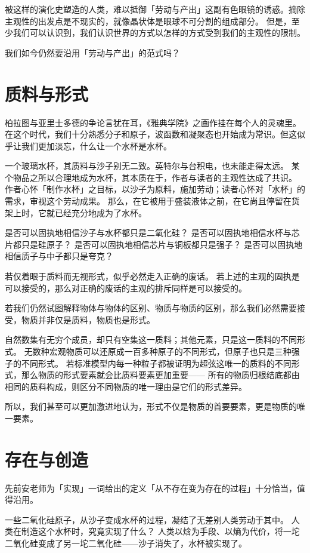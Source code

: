 被这样的演化史塑造的人类，难以抵御「劳动与产出」这副有色眼镜的诱惑。摘除主观性的出发点是不现实的，就像晶状体是眼球不可分割的组成部分。
但是，至少我们可以认识到，我们认识世界的方式以怎样的方式受到我们的主观性的限制。

我们如今仍然要沿用「劳动与产出」的范式吗？

\section{质料与形式}

柏拉图与亚里士多德的争论言犹在耳，《雅典学院》之画作挂在每个人的灵魂里。
在这个时代，我们十分熟悉分子和原子，波函数和凝聚态也开始成为常识。但这似乎让我们更加淡忘，什么让一个水杯是水杯。

一个玻璃水杯，其质料与沙子别无二致。英特尔与台积电，也未能走得太远。
某个物品之所以合理地成为水杯，其本质在于，作者与读者的主观性达成了共识。
作者心怀「制作水杯」之目标，以沙子为原料，施加劳动；读者心怀对「水杯」的需求，审视这个劳动成果。
那么，在它被用于盛装液体之前，在它尚且停留在货架上时，它就已经充分地成为了水杯。

是否可以固执地相信沙子与水杯都只是二氧化硅？
是否可以固执地相信水杯与芯片都只是硅原子？
是否可以固执地相信芯片与铜板都只是强子？
是否可以固执地相信质子与中子都只是夸克？

若仅着眼于质料而无视形式，似乎必然走入正确的废话。
若上述的主观的固执是可以接受的，那么对正确的废话的主观的排斥同样是可以接受的。

若我们仍然试图解释物体与物体的区别、物质与物质的区别，那么我们必然需要接受，物质并非仅是质料，物质也是形式。

自然数集有无穷个成员，却只有空集这一质料；其他元素，只是这一质料的不同形式。
无数种宏观物质可以还原成一百多种原子的不同形式，但原子也只是三种强子的不同形式。
若标准模型内每一种粒子都被证明为超弦这唯一的质料的不同形式，那么物质的形式要素就会比质料要素更加重要——
所有的物质归根结底都由相同的质料构成，则区分不同物质的唯一理由是它们的形式差异。

所以，我们甚至可以更加激进地认为，形式不仅是物质的首要要素，更是物质的唯一要素。

\section{存在与创造}

先前安老师为「实现」一词给出的定义「从不存在变为存在的过程」十分恰当，值得沿用。

一些二氧化硅原子，从沙子变成水杯的过程，凝结了无差别人类劳动于其中。
人类在制造这个水杯时，究竟实现了什么？
人类以焓为手段、以熵为代价，将一坨二氧化硅变成了另一坨二氧化硅——沙子消失了，水杯被实现了。

